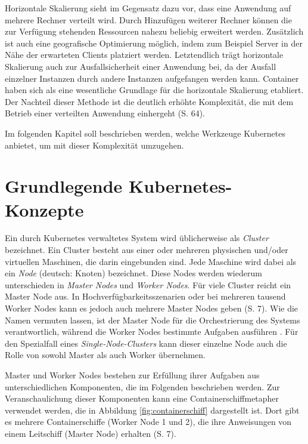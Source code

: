 \documentclass[11pt,a4paper]{article}
\begin{document}
Horizontale Skalierung sieht im Gegensatz dazu vor, dass eine Anwendung
auf mehrere Rechner verteilt wird. Durch Hinzufügen weiterer Rechner können die zur Verfügung stehenden Ressourcen nahezu beliebig erweitert werden.
Zusätzlich ist auch eine geografische Optimierung möglich, indem zum Beispiel Server in der Nähe der erwarteten Clients platziert werden.
Letztendlich trägt horizontale Skalierung auch zur Ausfallsicherheit einer Anwendung bei, da der Ausfall einzelner Instanzen durch andere Instanzen
aufgefangen werden kann.
Container haben sich als eine wesentliche Grundlage für die horizontale Skalierung etabliert.
Der Nachteil dieser Methode ist die deutlich erhöhte Komplexität,
die mit dem Betrieb einer verteilten Anwendung einhergeht \cite{Schmeling_Dargatz_2022} (S. 64).

Im folgenden Kapitel soll beschrieben werden, welche Werkzeuge Kubernetes anbietet, um mit dieser Komplexität umzugehen.

\section{Grundlegende Kubernetes-Konzepte}
\label{sec:Grundlegende_Kubernetes-Konzepte}
Ein durch Kubernetes verwaltetes System wird üblicherweise als \emph{Cluster} bezeichnet.
Ein Cluster besteht aus einer oder mehreren physischen und/oder virtuellen Maschinen, die darin eingebunden sind.
Jede Maschine wird dabei als ein \emph{Node} (deutsch: Knoten) bezeichnet. Diese Nodes werden wiederum unterschieden in
\emph{Master Nodes} und \emph{Worker Nodes}.
Für viele Cluster reicht ein Master Node aus. In Hochverfügbarkeitsszenarien oder bei mehreren
tausend Worker Nodes kann es jedoch auch mehrere Master Nodes geben \cite{Schmeling_Dargatz_2022} (S. 7).
Wie die Namen vermuten lassen, ist der Master Node für die Orchestrierung
des Systems verantwortlich, während die Worker Nodes bestimmte Aufgaben ausführen \cite{Bentaleb_Belloum_Sebaa_El-Maouhab_2021}.
Für den Spezialfall eines \emph{Single-Node-Clusters} kann dieser einzelne Node auch die Rolle von sowohl
Master als auch Worker übernehmen.

Master und Worker Nodes bestehen zur Erfüllung ihrer Aufgaben aus unterschiedlichen Komponenten,
die im Folgenden beschrieben werden.
Zur Veranschaulichung dieser Komponenten kann eine Containerschiffmetapher verwendet werden,
die in Abbildung \ref{fig:containerschiff} dargestellt ist. Dort gibt es mehrere Containerschiffe
(Worker Node 1 und 2), die ihre Anweisungen von einem Leitschiff (Master Node) erhalten \cite{Schmeling_Dargatz_2022} (S. 7).
\end{document}
